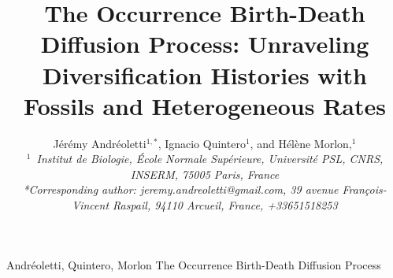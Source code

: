 \documentclass[oupdraft]{sysbio}
\begin{document}
\title{\textbf{The Occurrence Birth-Death Diffusion Process: Unraveling Diversification Histories with Fossils and Heterogeneous Rates}}


\author{Jérémy Andréoletti$^{1,\ast}$, Ignacio Quintero$^{1}$, and
Hélène Morlon,$^{1}$\\[4pt]
\textit{$^{1}$~Institut de Biologie, École Normale Supérieure, Université PSL, CNRS, INSERM, 75005 Paris, France}
\\[2pt]
\textit{*Corresponding author: \textit{jeremy.andreoletti@gmail.com}, 39 avenue François-Vincent Raspail, 94110 Arcueil, France, +33651518253}}


\markboth%
{Andréoletti, Quintero, Morlon}
{The Occurrence Birth-Death Diffusion Process}

\maketitle
\end{document}
